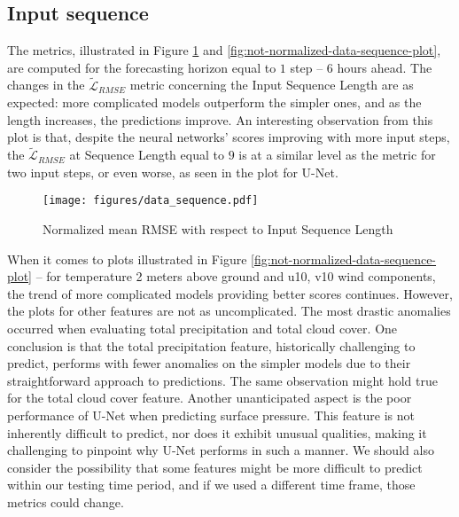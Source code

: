 \FloatBarrier

\subsection{Input sequence} \label{sec:input-sequence}
The metrics, illustrated in Figure \ref{fig:data-sequence-plot} and \ref{fig:not-normalized-data-sequence-plot}, are computed for the forecasting horizon equal to $1$ step -- 6 hours ahead.
The changes in the $\tilde{\mathcal{L}}_{RMSE}$ metric concerning the Input Sequence Length are as expected: more complicated models outperform the simpler ones, and as the length increases, the predictions improve. An interesting observation from this plot is that, despite the neural networks' scores improving with more input steps, the $\tilde{\mathcal{L}}_{RMSE}$ at Sequence Length equal to $9$ is at a similar level as the metric for two input steps, or even worse, as seen in the plot for U-Net.

\FloatBarrier

\begin{figure}[!ht]
    \centering
    \texttt{[image: figures/data\_sequence.pdf]}
    \caption{Normalized mean RMSE with respect to Input Sequence Length}
    \label{fig:data-sequence-plot}
\end{figure}

\FloatBarrier

When it comes to plots illustrated in Figure \ref{fig:not-normalized-data-sequence-plot} -- for temperature 2 meters above ground and u10, v10 wind components, the trend of more complicated models providing better scores continues. However, the plots for other features are not as uncomplicated. The most drastic anomalies occurred when evaluating total precipitation and total cloud cover. One conclusion is that the total precipitation feature, historically challenging to predict, performs with fewer anomalies on the simpler models due to their straightforward approach to predictions. The same observation might hold true for the total cloud cover feature. Another unanticipated aspect is the poor performance of U-Net when predicting surface pressure. This feature is not inherently difficult to predict, nor does it exhibit unusual qualities, making it challenging to pinpoint why U-Net performs in such a manner.
We should also consider the possibility that some features might be more difficult to predict within our testing time period, and if we used a different time frame, those metrics could change.

